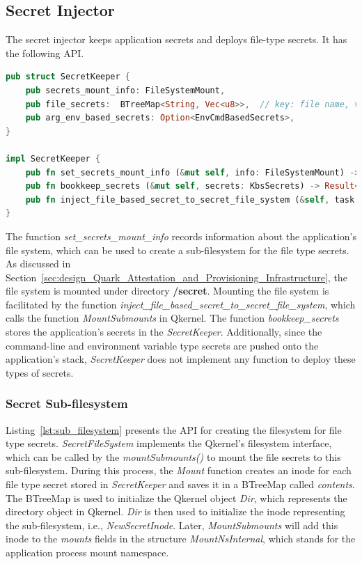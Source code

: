\subsection{Secret Injector}
The secret injector keeps application secrets and deploys file-type secrets. It has the following API. 
\begin{lstlisting}[language=rust, caption= API for Secret Injector, label={lst:Secret_injector}]
pub struct SecretKeeper {
    pub secrets_mount_info: FileSystemMount,
    pub file_secrets:  BTreeMap<String, Vec<u8>>,  // key: file name, value: secret
    pub arg_env_based_secrets: Option<EnvCmdBasedSecrets>,
}

impl SecretKeeper {
    pub fn set_secrets_mount_info (&mut self, info: FileSystemMount) -> Result<()>
    pub fn bookkeep_secrets (&mut self, secrets: KbsSecrets) -> Result<()>
    pub fn inject_file_based_secret_to_secret_file_system (&self, task: &Task) -> Result<()>
}   
\end{lstlisting}

The function \emph{set\_secrets\_mount\_info} records information about the application's file system, which can be used to create a sub-filesystem for the file type secrets. As discussed in Section~\ref{sec:design_Quark_Attestation_and_Provisioning_Infrastructure}, the file system is mounted under 
directory \textbf{/secret}. Mounting the file system is facilitated by the function \emph{inject\_file\_based\_secret\_to\_secret\_file\_system}, which calls the function \emph{MountSubmounts} in Qkernel. The function \emph{bookkeep\_secrets} stores the application's secrets in the \emph{SecretKeeper}. 
Additionally, since the command-line and environment variable type secrets are pushed onto the application's stack,  \emph{SecretKeeper} does not implement any function to deploy these types of secrets.

\subsubsection{Secret Sub-filesystem}
Listing~\ref{lst:sub_filesystem} presents the API for creating the filesystem for file type secrets. \emph{SecretFileSystem} implements the  Qkernel's filesystem interface, which can be called by the \emph{mountSubmounts()} to mount the file secrets to this sub-filesystem.  During this process, 
the \emph{Mount} function creates an inode for each file type secret stored in \emph{SecretKeeper} and saves it in a BTreeMap called \emph{contents}. The BTreeMap is used to initialize the Qkernel object \emph{Dir}, which represents the directory object in Qkernel. \emph{Dir} is then used to 
initialize the inode representing the sub-filesystem, i.e., \emph{NewSecretInode}. Later, \emph{MountSubmounts} will add this inode to the \emph{mounts} fields in the structure\emph{ MountNsInternal}, which stands for the application process mount namespace.

